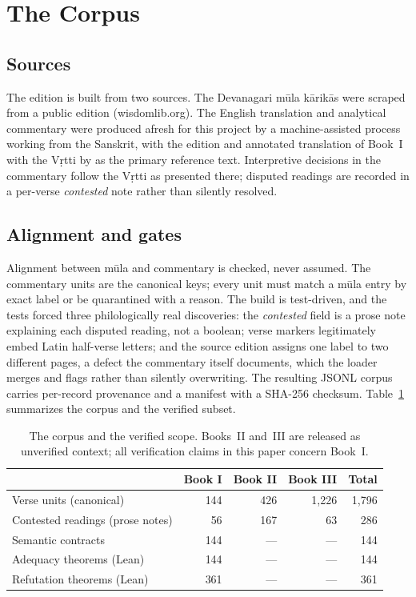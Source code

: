 \documentclass[11pt]{article}
\begin{document}
\section{The Corpus}
\label{sec:corpus}

\subsection{Sources}
The edition is built from two sources. The Devanagari m\={u}la
k\={a}rik\={a}s were scraped from a public edition (wisdomlib.org). The
English translation and analytical commentary were produced afresh for this
project by a machine-assisted process working from the Sanskrit, with the
edition and annotated translation of Book~I with the V\d{r}tti by
\citet{iyer1965vakyapadiya} as the primary reference text. Interpretive
decisions in the commentary follow the V\d{r}tti as presented there;
disputed readings are recorded in a per-verse \emph{contested} note rather
than silently resolved.

\subsection{Alignment and gates}
Alignment between m\={u}la and commentary is checked, never assumed. The
commentary units are the canonical keys; every unit must match a m\={u}la
entry by exact label or be quarantined with a reason. The build is
test-driven, and the tests forced three philologically real discoveries: the
\emph{contested} field is a prose note explaining each disputed reading, not
a boolean; verse markers legitimately embed Latin half-verse letters; and the
source edition assigns one label to two different pages, a defect the
commentary itself documents, which the loader merges and flags rather than
silently overwriting. The resulting JSONL corpus carries per-record
provenance and a manifest with a SHA-256 checksum.
Table~\ref{tab:corpus} summarizes the corpus and the verified subset.

\begin{table}[t]
\centering
\caption{The corpus and the verified scope. Books~II and~III are released as
unverified context; all verification claims in this paper concern Book~I.}
\label{tab:corpus}
\begin{tabular}{lrrrr}
\toprule
 & \textbf{Book I} & \textbf{Book II} & \textbf{Book III} & \textbf{Total} \\
\midrule
Verse units (canonical)          & 144 & 426 & 1,226 & 1,796 \\
Contested readings (prose notes) & 56  & 167 & 63    & 286 \\
Semantic contracts               & 144 & --- & ---   & 144 \\
Adequacy theorems (Lean)         & 144 & --- & ---   & 144 \\
Refutation theorems (Lean)       & 361 & --- & ---   & 361 \\
\bottomrule
\end{tabular}
\end{table}
\end{document}
